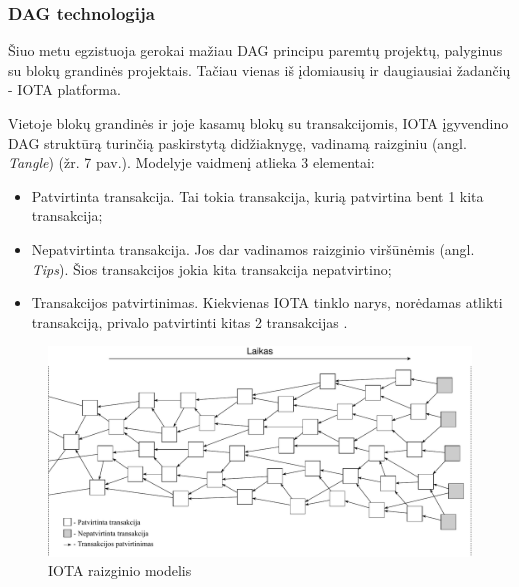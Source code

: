 \subsubsection{DAG technologija}

Šiuo metu egzistuoja gerokai mažiau DAG principu paremtų projektų, palyginus su blokų grandinės projektais. Tačiau vienas iš įdomiausių ir daugiausiai žadančių - IOTA platforma. 





Vietoje blokų grandinės ir joje kasamų blokų su transakcijomis, IOTA įgyvendino DAG struktūrą turinčią paskirstytą didžiaknygę, vadinamą raizginiu (angl. \textit{Tangle}) (žr. 7 pav.). Modelyje vaidmenį atlieka 3 elementai:
\begin{itemize}
    \item Patvirtinta transakcija. Tai tokia transakcija, kurią patvirtina bent 1 kita transakcija;
    \item Nepatvirtinta transakcija. Jos dar vadinamos raizginio viršūnėmis (angl. \textit{Tips}). Šios transakcijos jokia kita transakcija nepatvirtino;
    \item Transakcijos patvirtinimas. Kiekvienas IOTA tinklo narys, norėdamas atlikti transakciją, privalo patvirtinti kitas 2 transakcijas \cite{popov2016tangle}.
\end{itemize} 

\begin{figure}[H]
    \centering
    \includegraphics[scale=0.56]{images/iota-tangle}
    \caption{IOTA raizginio modelis}
\end{figure}

